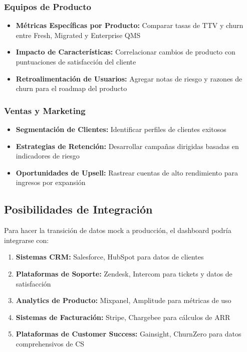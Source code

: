 \documentclass[12pt,a4paper]{article}
\begin{document}
\subsubsection{Equipos de Producto}
\begin{itemize}
    \item \textbf{Métricas Específicas por Producto:} Comparar tasas de TTV y churn entre Fresh, Migrated y Enterprise QMS
    \item \textbf{Impacto de Características:} Correlacionar cambios de producto con puntuaciones de satisfacción del cliente
    \item \textbf{Retroalimentación de Usuarios:} Agregar notas de riesgo y razones de churn para el roadmap del producto
\end{itemize}

\subsubsection{Ventas y Marketing}
\begin{itemize}
    \item \textbf{Segmentación de Clientes:} Identificar perfiles de clientes exitosos
    \item \textbf{Estrategias de Retención:} Desarrollar campañas dirigidas basadas en indicadores de riesgo
    \item \textbf{Oportunidades de Upsell:} Rastrear cuentas de alto rendimiento para ingresos por expansión
\end{itemize}

\subsection{Posibilidades de Integración}

Para hacer la transición de datos mock a producción, el dashboard podría integrarse con:

\begin{enumerate}
    \item \textbf{Sistemas CRM:} Salesforce, HubSpot para datos de clientes
    \item \textbf{Plataformas de Soporte:} Zendesk, Intercom para tickets y datos de satisfacción
    \item \textbf{Analytics de Producto:} Mixpanel, Amplitude para métricas de uso
    \item \textbf{Sistemas de Facturación:} Stripe, Chargebee para cálculos de ARR
    \item \textbf{Plataformas de Customer Success:} Gainsight, ChurnZero para datos comprehensivos de CS
\end{enumerate}
\end{document}
